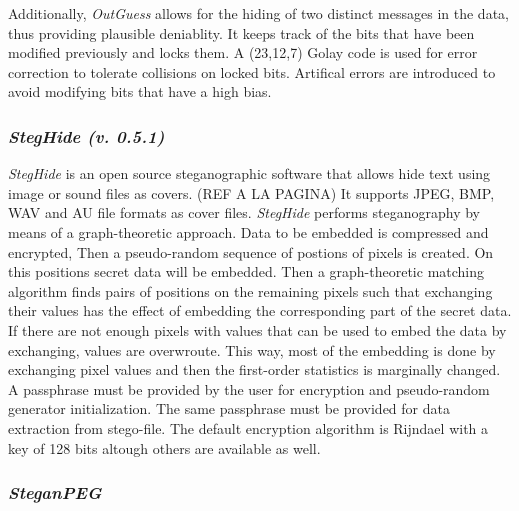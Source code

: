 \documentclass[11pt]{article}
\begin{document}
Additionally,  \textit{OutGuess}  allows  for the hiding of two distinct messages in the data, thus providing plausible 
deniablity.  It keeps track  of  the  bits  that  have  been  modified previously  and  locks  them.   A  (23,12,7)  Golay  code  
is used for error correction to tolerate collisions on locked bits.  Artifical errors are introduced  to  avoid  modifying bits 
that have a high bias.

\subsubsection{\textit{}}

\subsubsection{\textit{StegHide (v. 0.5.1)}}
\textit{StegHide} is an open source steganographic software that allows hide text using image or sound files as covers. (REF A LA PAGINA)
It supports JPEG, BMP, WAV and AU file formats as cover files. 
\textit{StegHide} performs steganography by means of a graph-theoretic approach. Data to be embedded is compressed and encrypted,
Then a pseudo-random sequence of postions of pixels is created. On this positions secret data will be embedded. Then a
graph-theoretic  matching  algorithm finds pairs of positions on the remaining pixels such that exchanging their values has
the effect of embedding the corresponding  part of the secret data. If there are not enough pixels with values that can be used
to embed the data by exchanging, values are overwroute. This way, most of the embedding  is  done  by  exchanging  pixel  values
and then the first-order statistics is marginally changed. A passphrase must be provided by the user for encryption and
pseudo-random generator initialization. The same passphrase must be provided for data extraction from stego-file. The default
encryption algorithm is Rijndael with a key of 128 bits altough others are available as well.



\subsubsection{\textit{}}

\subsubsection{\textit{SteganPEG}}

\end{document}

